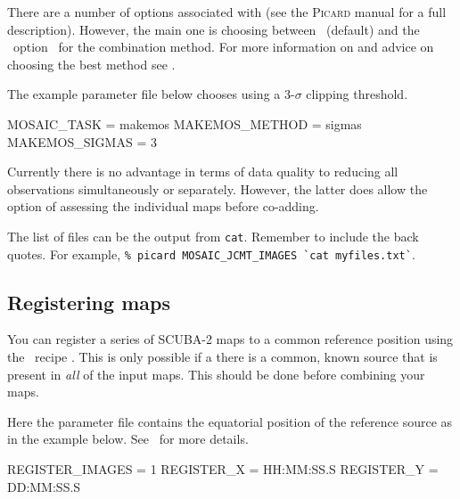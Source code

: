 There are a number of options associated with
 (see the \textsc{Picard} manual for a full
description). However, the main one is choosing between \wcsmosaic\
(default) and the \ccdpack\ option \makemos\ for the combination
method. For more information on \task{makemos} and advice on choosing the
best method see \xref{\textbf{SUN/139}}{sun139}{}.

The example parameter file below chooses  using a 3-$\sigma$
clipping threshold.

\begin{terminalv}
MOSAIC_TASK = makemos
MAKEMOS_METHOD = sigmas
MAKEMOS_SIGMAS = 3
\end{terminalv}

Currently there is no advantage in terms of data quality to reducing
all observations simultaneously or separately. However, the latter
does allow the option of assessing the individual maps before co-adding.

\begin{tip}
  The list of files can be the output from \texttt{cat}. Remember
  to include the back quotes.  For example, \texttt{\% picard
    MOSAIC\_JCMT\_IMAGES \`{}cat myfiles.txt\`{}}.
\end{tip}


\subsection{Registering maps}

You can register a series of SCUBA-2 maps to a common reference
position using the \picard\ recipe
.
This is only possible if a there is a common, known source that is
present in \textit{all} of the input maps. This should be done before
combining your maps.
\begin{terminalv}
\end{terminalv}

Here the parameter file contains the equatorial position of the
reference source as in the example below. See \picardsun\ for more
details.
\begin{center}
\begin{terminalv}
REGISTER_IMAGES = 1
REGISTER_X  = HH:MM:SS.S
REGISTER_Y  = DD:MM:SS.S
\end{terminalv}
\end{center}

